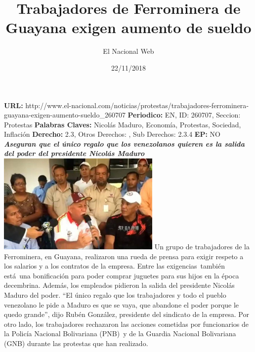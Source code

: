 \documentclass{article}%
\title{\textbf{Trabajadores de Ferrominera de Guayana exigen aumento de sueldo}}%
\author{El Nacional Web}%
\date{22/11/2018}%
\begin{document}
%
\normalsize%
\maketitle%
\textbf{URL: }%
http://www.el{-}nacional.com/noticias/protestas/trabajadores{-}ferrominera{-}guayana{-}exigen{-}aumento{-}sueldo\_260707\newline%
%
\textbf{Periodico: }%
EN, %
ID: %
260707, %
Seccion: %
Protestas\newline%
%
\textbf{Palabras Claves: }%
Nicolás Maduro, Economía, Protestas, Sociedad, Inflación\newline%
%
\textbf{Derecho: }%
2.3, %
Otros Derechos: %
, %
Sub Derechos: %
2.3.4\newline%
%
\textbf{EP: }%
NO\newline%
\newline%
%
\textbf{\textit{Aseguran que el único regalo que los venezolanos quieren es la salida del poder del presidente Nicolás Maduro}}%
\newline%
\newline%
%
\includegraphics[width=300px]{108.jpg}%
\newline%
%
Un grupo de trabajadores de la Ferrominera, en Guayana, realizaron una rueda de prensa para exigir respeto a los salarios y a los contratos de la empresa.%
\newline%
%
Entre las exigencias~también está~una bonificación para poder comprar juguetes para sus hijos en la época decembrina.%
\newline%
%
Además, los empleados pidieron la salida del presidente Nicolás Maduro del poder.%
\newline%
%
“El único regalo que los trabajadores y todo el pueblo venezolano le pide a Maduro es que se vaya, que abandone el poder porque le quedo grande”, dijo Rubén González, presidente del sindicato de la empresa.%
\newline%
%
Por otro lado, los trabajadores rechazaron las acciones cometidas por funcionarios de la Policía Nacional Bolivariana (PNB)~y de la Guardia Nacional Bolivariana (GNB) durante las protestas que han realizado.%
\newline%
%
\end{document}
